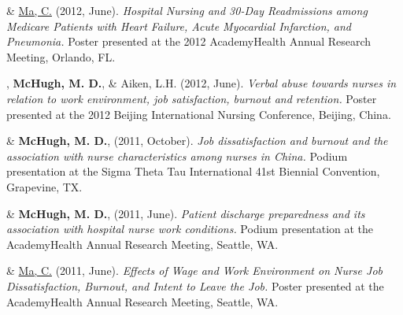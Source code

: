 \documentclass[10pt,]{article}
\begin{document}
{{{{{{{{{{{{{{{\begin{hangparas}{.25in}{1}
\end{hangparas}



\begin{hangparas}{.25in}{1}

 \& {\underline {Ma, C.}} (2012, June). {\textit {Hospital Nursing and 30-Day Readmissions among Medicare Patients with Heart Failure, Acute Myocardial Infarction, and Pneumonia.}} Poster presented at the 2012 AcademyHealth Annual Research Meeting, Orlando, FL.

\end{hangparas}



\begin{hangparas}{.25in}{1}

, {\textbf {McHugh, M. D.}}, \& Aiken, L.H. (2012, June). {\textit {Verbal abuse towards nurses in relation to work environment, job satisfaction, burnout and retention.}} Poster presented at the 2012 Beijing International Nursing Conference, Beijing, China.

\end{hangparas}



\begin{hangparas}{.25in}{1}

 \& {\textbf {McHugh, M. D.}}, (2011, October). {\textit {Job dissatisfaction and burnout and the association with nurse characteristics among nurses in China.}} Podium presentation at the Sigma Theta Tau International 41st Biennial Convention, Grapevine, TX.

\end{hangparas}



\begin{hangparas}{.25in}{1}

 \& {\textbf {McHugh, M. D.}}, (2011, June). {\textit {Patient discharge preparedness and its association with hospital nurse work conditions.}} Podium presentation at the AcademyHealth Annual Research Meeting, Seattle, WA.

\end{hangparas}



\begin{hangparas}{.25in}{1}

 \& {\underline {Ma, C.}} (2011, June). {\textit {Effects of Wage and Work Environment on Nurse Job Dissatisfaction, Burnout, and Intent to Leave the Job.}} Poster presented at the AcademyHealth Annual Research Meeting, Seattle, WA.


\end{hangparas}}}}}}}}}}}}}}}}
\end{document}
